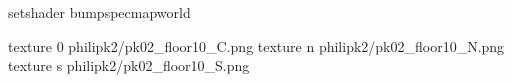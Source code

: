 setshader bumpspecmapworld

texture 0 philipk2/pk02_floor10_C.png
texture n philipk2/pk02_floor10_N.png
texture s philipk2/pk02_floor10_S.png

